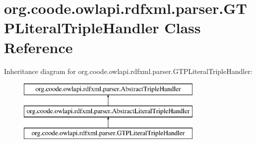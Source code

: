 \hypertarget{classorg_1_1coode_1_1owlapi_1_1rdfxml_1_1parser_1_1_g_t_p_literal_triple_handler}{\section{org.\-coode.\-owlapi.\-rdfxml.\-parser.\-G\-T\-P\-Literal\-Triple\-Handler Class Reference}
\label{classorg_1_1coode_1_1owlapi_1_1rdfxml_1_1parser_1_1_g_t_p_literal_triple_handler}
}
Inheritance diagram for org.\-coode.\-owlapi.\-rdfxml.\-parser.\-G\-T\-P\-Literal\-Triple\-Handler\-:\begin{figure}[H]
\begin{center}
\leavevmode
\includegraphics[height=3.000000cm]{classorg_1_1coode_1_1owlapi_1_1rdfxml_1_1parser_1_1_g_t_p_literal_triple_handler}
\end{center}
\end{figure}
